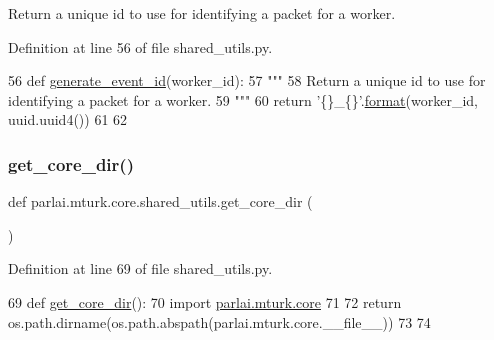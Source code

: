 \begin{DoxyVerb}Return a unique id to use for identifying a packet for a worker.
\end{DoxyVerb}
 

Definition at line 56 of file shared\+\_\+utils.\+py.


\begin{DoxyCode}
56 \textcolor{keyword}{def }\hyperlink{namespaceparlai_1_1mturk_1_1core_1_1shared__utils_aba2e4d48063dafc80e931f8925dbb755}{generate\_event\_id}(worker\_id):
57     \textcolor{stringliteral}{"""}
58 \textcolor{stringliteral}{    Return a unique id to use for identifying a packet for a worker.}
59 \textcolor{stringliteral}{    """}
60     \textcolor{keywordflow}{return} \textcolor{stringliteral}{'\{\}\_\{\}'}.\hyperlink{namespaceparlai_1_1mturk_1_1core_1_1shared__utils_a9cd2c4b48b3efc5296be64d403e00151}{format}(worker\_id, uuid.uuid4())
61 
62 
\end{DoxyCode}
\mbox{\label{namespaceparlai_1_1mturk_1_1core_1_1shared__utils_ac4e340ccc66c691fdd294c734dae0c5d}} 
\subsubsection{\texorpdfstring{get\+\_\+core\+\_\+dir()}{get\_core\_dir()}}
{\footnotesize\ttfamily def parlai.\+mturk.\+core.\+shared\+\_\+utils.\+get\+\_\+core\+\_\+dir (\begin{DoxyParamCaption}{ }\end{DoxyParamCaption})}



Definition at line 69 of file shared\+\_\+utils.\+py.


\begin{DoxyCode}
69 \textcolor{keyword}{def }\hyperlink{namespaceparlai_1_1mturk_1_1core_1_1shared__utils_ac4e340ccc66c691fdd294c734dae0c5d}{get\_core\_dir}():
70     \textcolor{keyword}{import} \hyperlink{namespaceparlai_1_1mturk_1_1core}{parlai.mturk.core}
71 
72     \textcolor{keywordflow}{return} os.path.dirname(os.path.abspath(parlai.mturk.core.\_\_file\_\_))
73 
74 
\end{DoxyCode}
\mbox{\label{namespaceparlai_1_1mturk_1_1core_1_1shared__utils_aabd480fc6090e1fa769ff3926f7e842d}} 
